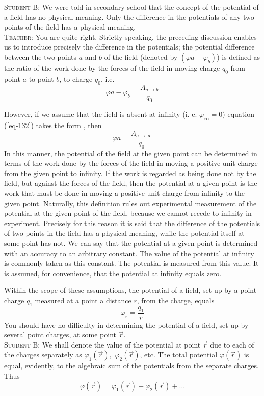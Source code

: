 \documentclass[a4paper,sfsidenotes]{tufte-book}
\begin{document}
\textsc{Student B:} We were told in secondary school that the concept of the potential of a field has no physical meaning. Only the difference in the potentials of any two points of the field has a physical meaning.
\\
\textsc{Teacher:} You are quite right. Strictly speaking, the preceding discussion enables us to introduce precisely the difference in the potentials; the potential difference between the two points $a$ and $b$ of the field (denoted by $\left( \varphi{a}-\varphi_{b} \right)$) is defined as the ratio of the work done by the forces of the field in moving charge $q_{0}$ from point $a$ to point $b$, to charge $q_{0}$, i.e.
\begin{equation}%
\varphi{a}-\varphi_{b}  = \frac{A_{a \to b}}{q_{0}}
\label{eq-132}
\end{equation}

However, if we assume that the field is absent at infinity (i. e. $\varphi_{\infty}=0$) equation (\ref{eq-132}) takes the form , then
\begin{equation}%
\varphi{a} = \frac{A_{a \to \infty}}{q_{0}}
\label{eq-133}
\end{equation}
In this manner, the potential of the field at the given point can be determined in terms of the work done by the forces of the field in moving a positive unit charge from the given point to infinity. If the work is regarded as being done not by the field, but against the forces of the field, then the potential at a given point is the work that must be done in moving a positive unit charge from infinity to the given point. Naturally, this definition rules out experimental measurement of the potential at the given point of the field, because we cannot recede to infinity in experiment. Precisely for this reason it is said that the difference of the potentials of two points in the field has a physical meaning, while the potential itself at some point has not. We can say that the potential at a given point is determined with an accuracy to an arbitrary constant. The value of the potential at infinity is commonly taken as this constant. The potential is measured from this value. It is assumed, for convenience, that the potential at infinity equals zero.

Within the scope of these assumptions, the potential of a field, set up by a point charge $q_{1}$ measured at a point a distance $r$, from the charge, equals
\begin{equation}%
\varphi_{r} = \frac{q_{1}}{r}
\label{eq-134}
\end{equation}
You should have no difficulty in determining the potential of a field, set up by several point charges, at some point $\vec{r}$.
\\
\textsc{Student B:} We shall denote the value of the potential at point $\vec{r}$ due to each of the charges separately as $\varphi_{1}(\vec{r}), \,\,\varphi_{2}(\vec{r})$, etc. The total potential $\varphi (\vec{r})$ is equal, evidently, to the algebraic sum of the potentials from the separate charges. Thus
\begin{equation}
\varphi (\vec{r}) = \varphi_{1}(\vec{r}) + \varphi_{2}(\vec{r}) + \ldots
\label{eq-135}
\end{equation}
\end{document}
